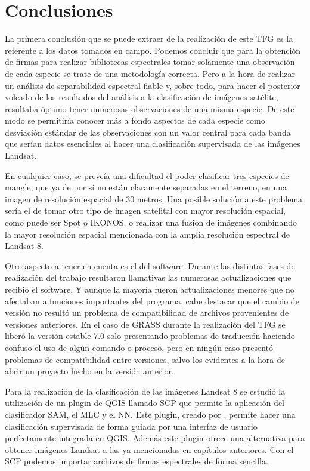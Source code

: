 


\chapter{Conclusiones}

La primera conclusión que se puede extraer de la realización de este \ac{TFG} es la referente a los datos tomados en campo. Podemos concluir que para la obtención de firmas para realizar bibliotecas espectrales tomar solamente una observación de cada especie se trate de una metodología correcta. Pero a la hora de realizar un análisis de separabilidad espectral fiable y, sobre todo, para hacer el posterior volcado de los resultados del análisis a la clasificación de imágenes satélite, resultaba óptimo tener numerosas observaciones de una misma especie. De este modo se permitiría conocer más a fondo aspectos de cada especie como desviación estándar de las observaciones con un valor central para cada banda que serían datos esenciales al hacer una clasificación supervisada de las imágenes Landsat.\Sep

En cualquier caso, se preveía una dificultad el poder clasificar tres especies de mangle, que ya de por sí no están claramente separadas en el terreno, en una imagen de resolución espacial de 30 metros. Una posible solución a este problema sería el de tomar otro tipo de imagen satelital con mayor resolución espacial, como puede ser Spot o IKONOS, o realizar una fusión de imágenes combinando la mayor resolución espacial mencionada con la amplia resolución espectral de Landsat 8.\Sep

Otro aspecto a tener en cuenta es el del software. Durante las distintas fases de realización del trabajo resultaron llamativas las numerosas actualizaciones que recibió el software. Y aunque la mayoría fueron actualizaciones menores que no afectaban a funciones importantes del programa, cabe destacar que el cambio de versión no resultó un problema de compatibilidad de archivos provenientes de versiones anteriores. En el caso de GRASS durante la realización del \ac{TFG} se liberó la versión estable 7.0 solo presentando problemas de traducción haciendo confuso el uso de algún comando o proceso, pero en ningún caso presentó problemas de compatibilidad entre versiones, salvo los evidentes a la hora de abrir un proyecto hecho en la versión anterior.\Sep

Para la realización de la clasificación de las imágenes Landsat 8 se estudió la utilización de un plugin de QGIS llamado \ac{SCP} que permite la aplicación del clasificador \ac{SAM}, el \ac{MLC} y el \ac{NN}. Este plugin, creado por \cite{Congedo2015}, permite hacer una clasificación supervisada de forma guiada por una interfaz de usuario perfectamente integrada en QGIS. Además este plugin ofrece una alternativa para obtener imágenes Landsat a las ya mencionadas en capítulos anteriores. Con el \ac{SCP} podemos importar archivos de firmas espectrales de forma sencilla.\Sep

